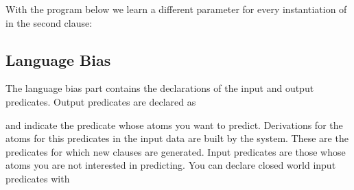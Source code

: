 \documentclass[letterpaper,10pt,english]{sphinxmanual}
\begin{document}
\sphinxAtStartPar
With the program below we learn a different parameter for every instantiation of  in the second clause:

\begin{sphinxVerbatim}[commandchars=\\\{\}]
\PYG{p}{[} 
         
        \PYG{p}{]}
\end{sphinxVerbatim}


\subsection{Language Bias}
\label{\detokenize{index:language-bias}}
\sphinxAtStartPar
The language bias part contains the declarations of the input and output predicates.
Output predicates are declared as

\begin{sphinxVerbatim}[commandchars=\\\{\}]
\end{sphinxVerbatim}

\sphinxAtStartPar
and indicate the predicate whose atoms you want to predict.
Derivations for the atoms for this predicates in the input data are built by the system.
These are the predicates for which new clauses are generated.
Input predicates are those whose atoms you are not interested in predicting.
You can declare closed world input predicates with

\begin{sphinxVerbatim}[commandchars=\\\{\}]
\end{sphinxVerbatim}
\end{document}
